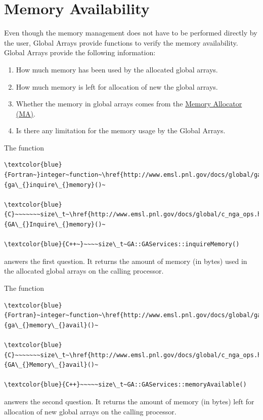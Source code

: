 \section{Memory Availability }

Even though the memory management does not have to be performed directly
by the user, Global Arrays provide functions to verify the memory
availability. Global Arrays provide the following information:
\begin{enumerate}
\item How much memory has been used by the allocated global arrays. 
\item How much memory is left for allocation of new the global arrays. 
\item Whether the memory in global arrays comes from the \href{http://www.emsl.pnl.gov/docs/parsoft/ma/MAapi.html}{Memory Allocator (MA)}. 
\item Is there any limitation for the memory usage by the Global Arrays.
\end{enumerate}
The function
\begin{verbatim}
\textcolor{blue}{Fortran~}integer~function~\href{http://www.emsl.pnl.gov/docs/global/ga_ops.html\#ga_inquire_memory}{ga\_{}inquire\_{}memory}()~

\textcolor{blue}{C}~~~~~~~size\_t~\href{http://www.emsl.pnl.gov/docs/global/c_nga_ops.html\#ga_inquire_memory}{GA\_{}Inquire\_{}memory}()~

\textcolor{blue}{C++~}~~~~size\_t~GA::GAServices::inquireMemory()
\end{verbatim}
answers the first question. It returns the amount of memory (in bytes)
used in the allocated global arrays on the calling processor.

The function
\begin{verbatim}
\textcolor{blue}{Fortran}~integer~function~\href{http://www.emsl.pnl.gov/docs/global/ga_ops.html\#ga_memory_avail}{ga\_{}memory\_{}avail}()~

\textcolor{blue}{C}~~~~~~~size\_t~\href{http://www.emsl.pnl.gov/docs/global/c_nga_ops.html\#ga_memory_avail}{GA\_{}Memory\_{}avail}()~

\textcolor{blue}{C++}~~~~~size\_t~GA::GAServices::memoryAvailable()
\end{verbatim}
answers the second question. It returns the amount of memory (in bytes)
left for allocation of new global arrays on the calling processor.

